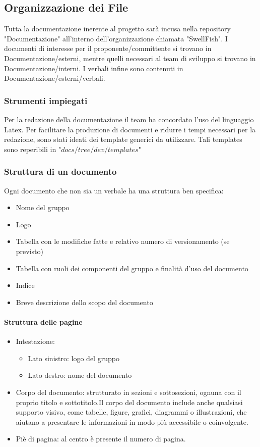 \documentclass[12pt]{article}
\begin{document}
\subsection{Organizzazione dei File}
Tutta la documentazione inerente al progetto sarà incusa nella repository "Documentazione" all'interno dell'organizzazione chiamata "SwellFish".
I documenti di interesse per il proponente/committente si trovano in Documentazione/esterni, mentre quelli necessari al team di sviluppo si trovano in Documentazione/interni. 
I verbali infine sono contenuti in Documentazione/esterni/verbali.
\subsubsection{Strumenti impiegati}
Per la redazione della documentazione il team ha concordato l'uso del linguaggio Latex.
Per facilitare la produzione di documenti e ridurre i tempi necessari per la redazione, sono stati ideati dei template generici da utilizzare.
Tali templates sono reperibili in "$docs/tree/dev/templates$"
\subsubsection{Struttura di un documento}
Ogni documento che non sia un verbale ha una struttura ben specifica:
\begin{itemize}
    \item Nome del gruppo
    \item Logo 
    \item Tabella con le modifiche fatte e relativo numero di versionamento (se previsto)
    \item Tabella con ruoli dei componenti del gruppo e finalità d'uso del documento
    \item Indice
    \item Breve descrizione dello scopo del documento
\end{itemize}
\paragraph{Struttura delle pagine}
\begin{itemize}
	\item Intestazione:
		\begin{itemize}
			\item Lato sinistro:  logo del gruppo
			\item Lato destro: nome del documento
		\end{itemize}
	\item Corpo del documento:  strutturato in sezioni e sottosezioni, ognuna con il proprio titolo e sottotitolo.Il corpo del documento include anche qualsiasi supporto visivo, come tabelle, figure, grafici, 	diagrammi o illustrazioni, che aiutano a presentare le informazioni in modo più accessibile o coinvolgente.
	\item Piè di pagina: al centro è presente il numero di pagina.
\end{itemize}
\end{document}
